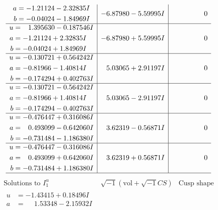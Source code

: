\documentclass[1p]{elsarticle_modified}
\theoremstyle{definition}
\newcommand{\I}{\sqrt{-1}}
\begin{document}
$$\begin{array}{c|c|c}
\begin{aligned}
a &= -1.21124 - 2.32835 I \\
b &= -0.04024 - 1.84969 I\end{aligned}
 & -6.87980 - 5.59995 I & \phantom{-0.000000 } 0 \\ \hline\begin{aligned}
u &= \phantom{-}1.395630 - 0.187546 I \\
a &= -1.21124 + 2.32835 I \\
b &= -0.04024 + 1.84969 I\end{aligned}
 & -6.87980 + 5.59995 I & \phantom{-0.000000 } 0 \\ \hline\begin{aligned}
u &= -0.130721 + 0.564242 I \\
a &= -0.81966 - 1.40814 I \\
b &= -0.174294 + 0.402763 I\end{aligned}
 & \phantom{-}5.03065 + 2.91197 I & \phantom{-0.000000 } 0 \\ \hline\begin{aligned}
u &= -0.130721 - 0.564242 I \\
a &= -0.81966 + 1.40814 I \\
b &= -0.174294 - 0.402763 I\end{aligned}
 & \phantom{-}5.03065 - 2.91197 I & \phantom{-0.000000 } 0 \\ \hline\begin{aligned}
u &= -0.476447 + 0.316086 I \\
a &= \phantom{-}0.493099 - 0.642060 I \\
b &= -0.731484 - 1.186380 I\end{aligned}
 & \phantom{-}3.62319 - 0.56871 I & \phantom{-0.000000 } 0 \\ \hline\begin{aligned}
u &= -0.476447 - 0.316086 I \\
a &= \phantom{-}0.493099 + 0.642060 I \\
b &= -0.731484 + 1.186380 I\end{aligned}
 & \phantom{-}3.62319 + 0.56871 I & \phantom{-0.000000 } 0\\
 \hline 
 \end{array}$$\newpage$$\begin{array}{c|c|c}  
\text{Solutions to }I^u_{1}& \I (\text{vol} + \sqrt{-1}CS) & \text{Cusp shape}\\
 \hline 
\begin{aligned}
u &= -1.43415 + 0.18496 I \\
a &= \phantom{-}1.53348 - 2.15932 I \\

\end{aligned}
\end{array}$$
\end{document}
